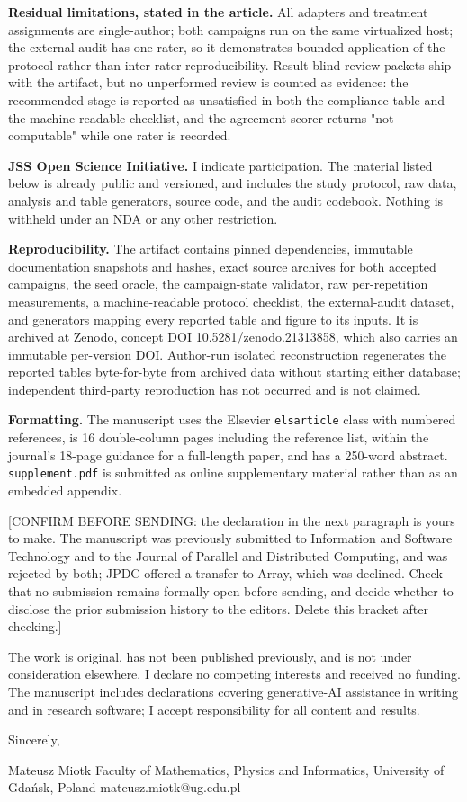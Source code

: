 \documentclass[11pt,a4paper]{article}
\begin{document}
\textbf{Residual limitations, stated in the article.} All adapters and treatment assignments are single-author; both campaigns run on the same virtualized host; the external audit has one rater, so it demonstrates bounded application of the protocol rather than inter-rater reproducibility. Result-blind review packets ship with the artifact, but no unperformed review is counted as evidence: the recommended stage is reported as unsatisfied in both the compliance table and the machine-readable checklist, and the agreement scorer returns "not computable" while one rater is recorded.

\textbf{JSS Open Science Initiative.} I indicate participation. The material listed below is already public and versioned, and includes the study protocol, raw data, analysis and table generators, source code, and the audit codebook. Nothing is withheld under an NDA or any other restriction.

\textbf{Reproducibility.} The artifact contains pinned dependencies, immutable documentation snapshots and hashes, exact source archives for both accepted campaigns, the seed oracle, the campaign-state validator, raw per-repetition measurements, a machine-readable protocol checklist, the external-audit dataset, and generators mapping every reported table and figure to its inputs. It is archived at Zenodo, concept DOI 10.5281/zenodo.21313858, which also carries an immutable per-version DOI. Author-run isolated reconstruction regenerates the reported tables byte-for-byte from archived data without starting either database; independent third-party reproduction has not occurred and is not claimed.

\textbf{Formatting.} The manuscript uses the Elsevier \texttt{elsarticle} class with numbered references, is 16 double-column pages including the reference list, within the journal's 18-page guidance for a full-length paper, and has a 250-word abstract. \texttt{supplement.pdf} is submitted as online supplementary material rather than as an embedded appendix.

[CONFIRM BEFORE SENDING: the declaration in the next paragraph is yours to make. The manuscript was previously submitted to Information and Software Technology and to the Journal of Parallel and Distributed Computing, and was rejected by both; JPDC offered a transfer to Array, which was declined. Check that no submission remains formally open before sending, and decide whether to disclose the prior submission history to the editors. Delete this bracket after checking.]

The work is original, has not been published previously, and is not under consideration elsewhere. I declare no competing interests and received no funding. The manuscript includes declarations covering generative-AI assistance in writing and in research software; I accept responsibility for all content and results.

Sincerely,

Mateusz Miotk Faculty of Mathematics, Physics and Informatics, University of Gdańsk, Poland mateusz.miotk@ug.edu.pl
\end{document}
